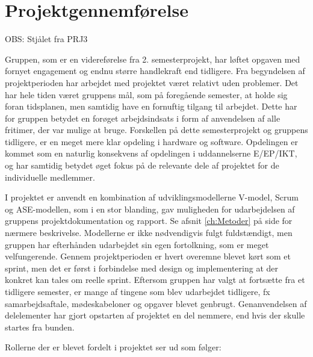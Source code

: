 \section{Projektgennemførelse} \label{ch:Projektgennemfoerelse}

OBS: Stjålet fra PRJ3

Gruppen, som er en videreførelse fra 2. semesterprojekt, har løftet opgaven med fornyet engagement og endnu større handlekraft end tidligere. Fra begyndelsen af projektperioden har arbejdet med projektet været relativt uden problemer. Det har hele tiden været gruppens mål, som på foregående semester, at holde sig foran tidsplanen\cite{lib:Tidsplan}, men samtidig have en fornuftig tilgang til arbejdet. Dette har for gruppen betydet en forøget arbejdsindsats i form af anvendelsen af alle fritimer, der var mulige at bruge.  
Forskellen på dette semesterprojekt og gruppens tidligere, er en meget mere klar opdeling i hardware og software. Opdelingen er kommet som en naturlig konsekvens af opdelingen i uddannelserne E/EP/IKT, og har samtidig betydet øget fokus på de relevante dele af projektet for de individuelle medlemmer. 

I projektet er anvendt en kombination af udviklingsmodellerne V-model, Scrum og ASE-modellen, som i en stor blanding, gav muligheden for udarbejdelsen af gruppens projektdokumentation og rapport. Se afsnit \ref{ch:Metoder}  på side \pageref{ch:Metoder} for nærmere beskrivelse. Modellerne er ikke nødvendigvis fulgt fuldstændigt, men gruppen har efterhånden udarbejdet sin egen fortolkning, som er meget velfungerende. Gennem projektperioden er hvert overemne blevet kørt som et sprint, men det er  først i forbindelse med design og implementering at der konkret kan tales om reelle sprint. 
Eftersom gruppen har valgt at fortsætte fra et tidligere semester, er mange af tingene som blev udarbejdet tidligere, fx samarbejdsaftale, mødeskabeloner og opgaver blevet genbrugt. Genanvendelsen af delelementer har gjort opstarten af projektet en del nemmere, end hvis der skulle startes fra bunden.

Rollerne der er blevet fordelt i projektet ser ud som følger:

